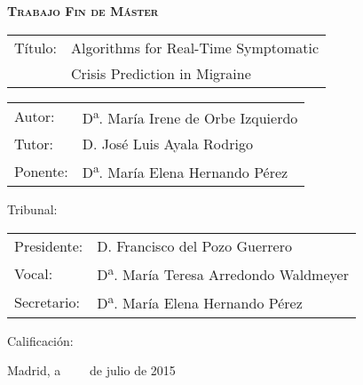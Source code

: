 


\begin{center}
\large
\textsc{\textbf{Trabajo Fin de Máster}}\\
\end{center}

\vspace*{3cm}

\begin{tabular}{p{3cm}l}
Título:&Algorithms for Real-Time Symptomatic\\
&Crisis Prediction in Migraine\\
\end{tabular}


\vspace*{0.5cm}

\begin{tabular}{p{3cm}l}
Autor:&D\textsuperscript{a}. María Irene de Orbe Izquierdo\\
Tutor:&D. José Luis Ayala Rodrigo\\
Ponente:&D\textsuperscript{a}. María Elena Hernando Pérez\\
\end{tabular}

\vspace*{2.5cm}
Tribunal:

\vspace*{0.5cm}
\begin{tabular}{p{3cm}l}
	Presidente:&D. Francisco del Pozo Guerrero\\
	Vocal:&D\textsuperscript{a}. María Teresa Arredondo Waldmeyer\\
	Secretario:&D\textsuperscript{a}. María Elena Hernando Pérez\\
\end{tabular}


\vspace*{1.5cm}


Calificación:

\vspace*{2cm}

\begin{flushright}
Madrid, a \ \ \ \  de julio de 2015
\end{flushright}

\thispagestyle{empty}
